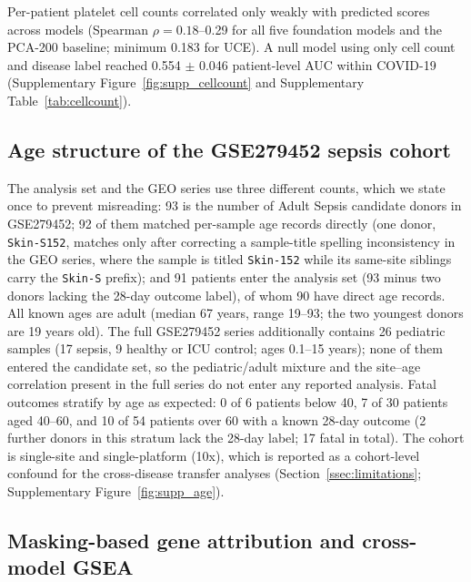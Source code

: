 \documentclass[11pt,a4paper]{article}
\newcommand{\model}[1]{\textsc{#1}}
\begin{document}
Per-patient platelet cell counts correlated only weakly with predicted scores
across models (Spearman $\rho = 0.18$--0.29 for all five foundation models and
the PCA-200 baseline; minimum 0.183 for \model{UCE}). A null model using only
cell count and disease label reached 0.554 $\pm$ 0.046 patient-level AUC within
COVID-19 (Supplementary Figure~\ref{fig:supp_cellcount} and Supplementary
Table~\ref{tab:cellcount}).

\subsection{Age structure of the GSE279452 sepsis cohort}
\label{sn:age}

The analysis set and the GEO series use three different counts, which we
state once to prevent misreading: 93 is the number of Adult Sepsis candidate
donors in GSE279452; 92 of them matched per-sample age records directly (one
donor, \texttt{Skin-S152}, matches only after correcting a sample-title
spelling inconsistency in the GEO series, where the sample is titled
\texttt{Skin-152} while its same-site siblings carry the \texttt{Skin-S}
prefix); and 91 patients enter the analysis set (93 minus two donors lacking
the 28-day outcome label), of whom 90 have direct age records. All known ages
are adult (median 67 years, range 19--93; the two youngest donors are 19
years old). The full GSE279452 series additionally contains 26 pediatric
samples (17 sepsis, 9 healthy or ICU control; ages 0.1--15 years); none of
them entered the candidate set, so the pediatric/adult mixture and the
site--age correlation present in the full series do not enter any reported
analysis. Fatal outcomes stratify by age as expected:
0 of 6 patients below 40, 7 of 30 patients aged 40--60, and 10 of 54
patients over 60 with a known 28-day outcome (2 further donors in this stratum
lack the 28-day label; 17 fatal in total). The cohort is single-site and single-platform
(10x), which is reported as a cohort-level confound for the cross-disease
transfer analyses (Section~\ref{ssec:limitations}; Supplementary
Figure~\ref{fig:supp_age}).

\subsection{Masking-based gene attribution and cross-model GSEA}
\label{sn:attribution_gsea}
\end{document}
